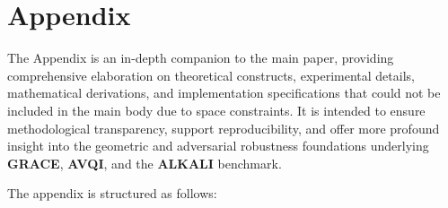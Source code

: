 



\appendix
\section{Appendix}
\label{sec:appendix}

The Appendix is an in-depth companion to the main paper, providing comprehensive elaboration on theoretical constructs, experimental details, mathematical derivations, and implementation specifications that could not be included in the main body due to space constraints. It is intended to ensure methodological transparency, support reproducibility, and offer more profound insight into the geometric and adversarial robustness foundations underlying \textbf{GRACE}, \textbf{AVQI}, and the \textbf{ALKALI} benchmark.

The appendix is structured as follows:

